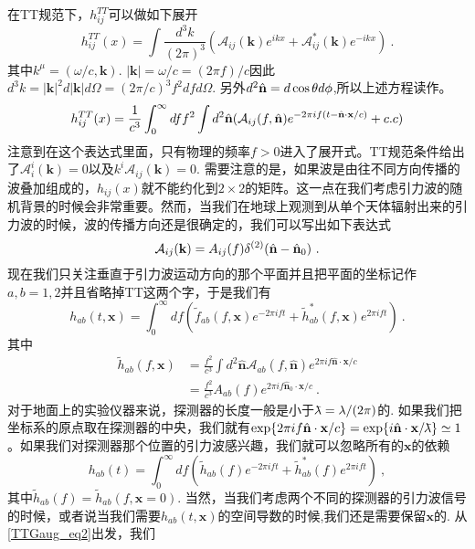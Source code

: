 在TT规范下，$h^{TT}_{ij}$可以做如下展开
\begin{equation}
h^{TT}_{ij}(x) = \int \frac{d^3 k}{(2\pi)^3} (\mathcal A_{ij}(\mathbf k) e^{ikx} + \mathcal A_{ij}^* (\mathbf k) e^{-i k x} ) ~. 
\end{equation}
其中$k^\mu = (\omega/c,\mathbf k)$. $|\mathbf k| = \omega/c = (2\pi f)/c$因此$d^3 k = |\mathbf k|^2 d|\mathbf k| d\Omega = (2\pi/c)^3 f^2 df d\Omega $. 另外$d^2\hat{\bf{n}} = d\cos\theta d\phi$,所以上述方程读作。
\begin{equation}
h^{TT}_{ij}(x) = \frac{1}{c^3} \int^\infty_0 df f^2 \int d^2 \hat{ \bf{n} } ( \mathcal A_{ij} (f,\hat{ \bf{n} }) e^{-2\pi i f(t-\hat{ {\bf n} } \cdot {\bf x} /c  )}  + {c.c} ) 
\end{equation}
注意到在这个表达式里面，只有物理的频率$f>0$进入了展开式。TT规范条件给出了$\mathcal A^i_i (\mathbf k) =0 $以及$k^i \mathcal A_{ij} (\mathbf k) =0 $. 需要注意的是，如果波是由往不同方向传播的波叠加组成的，$h_{ij}(x)$就不能约化到$2\times 2$的矩阵。这一点在我们考虑引力波的随机背景的时候会非常重要。然而，当我们在地球上观测到从单个天体辐射出来的引力波的时候，波的传播方向还是很确定的，我们可以写出如下表达式
\begin{equation}
\mathcal A_{ij} (\mathbf k) = A_{ij} (f) \delta^{(2)} (\hat{  \mathbf n } - \hat{ {\bf n} }_0 )~.
\end{equation}
现在我们只关注垂直于引力波运动方向的那个平面并且把平面的坐标记作$a,b = 1,2$并且省略掉TT这两个字，于是我们有
\begin{equation}
h_{ab} (t,\mathbf x ) = \int^\infty_0 df ( \tilde f_{ab} (f,\mathbf x) e^{-2\pi i f t} + \tilde h^*_{ab} (f,\mathbf x) e^{2\pi i f t} ) ~. 
\end{equation}
其中
\begin{equation}
\begin{aligned}
\tilde h_{ab} (f,\mathbf x) & = \frac{f^2}{c^3} \int d^2 \hat{  \mathbf n } \mathcal A_{ab} (f, \hat{\mathbf{n}}) e^{2\pi i f \hat{  \mathbf n } \cdot \mathbf x / c  } \\
& = \frac{f^2}{c^3} A_{ab} (f) e^{2\pi i f {\hat{\mathbf n}_0 \cdot \mathbf x /c  } }~.
\end{aligned}
\end{equation} 
对于地面上的实验仪器来说，探测器的长度一般是小于${\mkern0.7mu {\bar{\phantom{a}}} \mkern -11mu\lambda} = \lambda/(2\pi)$的. 如果我们把坐标系的原点取在探测器的中央，我们就有$\exp  \{   2\pi i f \hat{ \mathbf n } \cdot \mathbf x/c \} = \exp \{ i \hat{ {\bf n} } \cdot \mathbf x / {\mkern0.75mu {\bar{\phantom{a}}} \mkern -11.75mu\lambda} \} \simeq 1  $。如果我们对探测器那个位置的引力波感兴趣，我们就可以忽略所有的$\mathbf x$的依赖
\begin{equation}
h_{ab} (t) = \int^\infty_0 df ( \tilde h_{ab} (f) e^{-2\pi i f t} + \tilde h^*_{ab} (f) e^{2\pi i f t} ) ~, 
\end{equation}
其中$\tilde h_{ab}(f) = \tilde h_{ab}(f,\mathbf x = 0)$. 当然，当我们考虑两个不同的探测器的引力波信号的时候，或者说当我们需要$h_{ab}(t,\mathbf x)$的空间导数的时候,我们还是需要保留$\mathbf x$的. 从\autoref{TTGaug_eq2}出发，我们
 


 

















